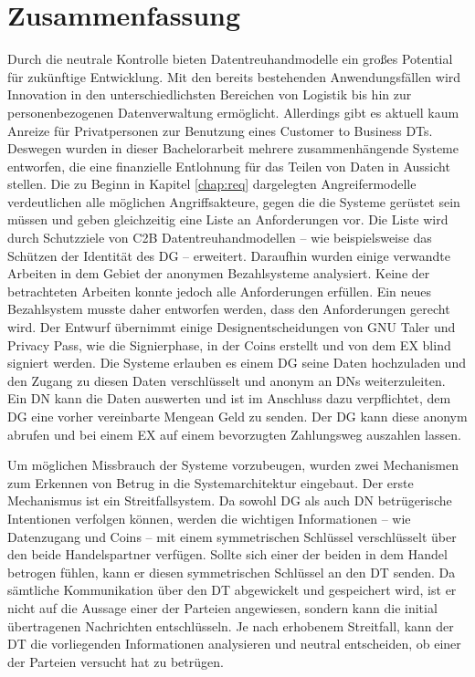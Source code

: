 \documentclass[
	fontsize=11pt,
	headings=small,
	parskip=half,           %
	bibliography=totoc,
	numbers=noenddot,       %
	open=any,               %
]{scrreprt}
\begin{document}
\chapter{Zusammenfassung}
Durch die neutrale Kontrolle bieten Datentreuhandmodelle ein großes Potential für zukünftige Entwicklung. Mit den bereits bestehenden Anwendungsfällen wird Innovation in den unterschiedlichsten Bereichen von Logistik bis hin zur personenbezogenen Datenverwaltung ermöglicht. Allerdings gibt es aktuell kaum Anreize für Privatpersonen zur Benutzung eines Customer to Business DTs. Deswegen wurden in dieser Bachelorarbeit mehrere zusammenhängende Systeme entworfen, die eine finanzielle Entlohnung für das Teilen von Daten in Aussicht stellen. Die zu Beginn in Kapitel \ref{chap:req} dargelegten Angreifermodelle verdeutlichen alle möglichen Angriffsakteure, gegen die die Systeme gerüstet sein müssen und geben gleichzeitig eine Liste an Anforderungen vor. Die Liste wird durch Schutzziele von C2B Datentreuhandmodellen -- wie beispielsweise das Schützen der Identität des DG -- erweitert. Daraufhin wurden einige verwandte Arbeiten in dem Gebiet der anonymen Bezahlsysteme analysiert. Keine der betrachteten Arbeiten konnte jedoch alle Anforderungen erfüllen. Ein neues Bezahlsystem musste daher entworfen werden, dass den Anforderungen gerecht wird. Der Entwurf übernimmt einige Designentscheidungen von GNU Taler und Privacy Pass, wie die Signierphase, in der Coins erstellt und von dem EX blind signiert werden. Die Systeme erlauben es einem DG seine Daten hochzuladen und den Zugang zu diesen Daten verschlüsselt und anonym an DNs weiterzuleiten. Ein DN kann die Daten auswerten und ist im Anschluss dazu verpflichtet, dem DG eine vorher vereinbarte Mengean Geld zu senden. Der DG kann diese anonym abrufen und bei einem EX auf einem bevorzugten Zahlungsweg auszahlen lassen.

Um möglichen Missbrauch der Systeme vorzubeugen, wurden zwei Mechanismen zum Erkennen von Betrug in die Systemarchitektur eingebaut. Der erste Mechanismus ist ein Streitfallsystem. Da sowohl DG als auch DN betrügerische Intentionen verfolgen können, werden die wichtigen Informationen -- wie Datenzugang und Coins -- mit einem symmetrischen Schlüssel verschlüsselt über den beide Handelspartner verfügen. Sollte sich einer der beiden in dem Handel betrogen fühlen, kann er diesen symmetrischen Schlüssel an den DT senden. Da sämtliche Kommunikation über den DT abgewickelt und gespeichert wird, ist er nicht auf die Aussage einer der Parteien angewiesen, sondern kann die initial übertragenen Nachrichten entschlüsseln. Je nach erhobenem Streitfall, kann der DT die vorliegenden Informationen analysieren und neutral entscheiden, ob einer der Parteien versucht hat zu betrügen.
\end{document}
